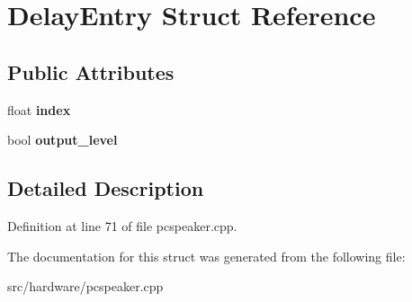 \hypertarget{structDelayEntry}{\section{Delay\-Entry Struct Reference}
\label{structDelayEntry}
}
\subsection*{Public Attributes}
\begin{DoxyCompactItemize}
\item 
\hypertarget{structDelayEntry_ab6240fce825f9dbfb3a360d5858f45e3}{float {\bfseries index}}\label{structDelayEntry_ab6240fce825f9dbfb3a360d5858f45e3}

\item 
\hypertarget{structDelayEntry_aec0e84ff03d91c54149675eb9d765985}{bool {\bfseries output\-\_\-level}}\label{structDelayEntry_aec0e84ff03d91c54149675eb9d765985}

\end{DoxyCompactItemize}


\subsection{Detailed Description}


Definition at line 71 of file pcspeaker.\-cpp.



The documentation for this struct was generated from the following file\-:\begin{DoxyCompactItemize}
\item 
src/hardware/pcspeaker.\-cpp\end{DoxyCompactItemize}
